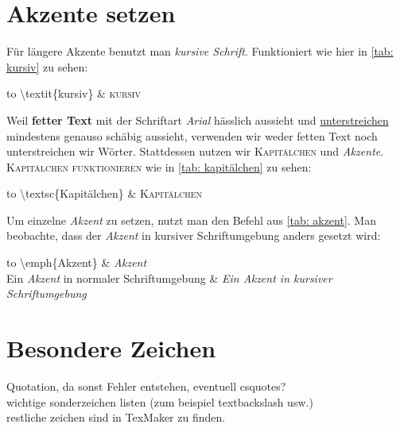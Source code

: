 \section{Akzente setzen}%
Für längere Akzente benutzt man \textit{kursive Schrift}. Funktioniert wie hier in \ref{tab: kursiv} zu sehen:\\%
\begin{table}[h]%
\begin{tabu} to \textwidth {X[c]X[c]}%
\toprule%
\textbackslash textit\{kursiv\} & \textsc{kursiv} \\%
\bottomrule%
\end{tabu}%
\caption{kursiv}%
\label{tab: kursiv}%
\end{table}%
%
%
Weil \textbf{fetter Text} mit der Schriftart \emph{Arial} hässlich aussieht und \underline{unterstreichen} mindestens genauso schäbig aussieht, verwenden wir weder fetten Text noch unterstreichen wir Wörter. Stattdessen nutzen wir \textsc{Kapitälchen} und \emph{Akzente}. \textsc{Kapitälchen funktionieren} wie in \ref{tab: kapitälchen} zu sehen:\\%
\begin{table}[h]%
\begin{tabu} to \textwidth {X[c]X[c]}%
\toprule%
\textbackslash textsc\{Kapitälchen\} & \textsc{Kapitälchen} \\%
\bottomrule%
\end{tabu}%
\caption{Kapitälchen}%
\label{tab: kapitälchen}%
\end{table}%
%
%
Um einzelne \emph{Akzent} zu setzen, nutzt man den Befehl aus \ref{tab: akzent}. Man beobachte, dass der \emph{Akzent} in kursiver Schriftumgebung anders gesetzt wird:%
\begin{table}[h]%
\begin{tabu} to \textwidth {X[c]X[c]}%
\toprule%
\textbackslash emph\{Akzent\} & \emph{Akzent} \\%
Ein \emph{Akzent} in normaler Schriftumgebung & \textit{Ein \emph{Akzent} in kursiver Schriftumgebung}\\%
\bottomrule%
\end{tabu}%
\caption{Akzent}%
\label{tab: akzent}%
\end{table}%
%
%
\section{Besondere Zeichen}%
Quotation, da sonst Fehler entstehen, eventuell csquotes?\\%
wichtige sonderzeichen listen (zum beispiel textbackslash usw.)\\%
restliche zeichen sind in TexMaker zu finden.%